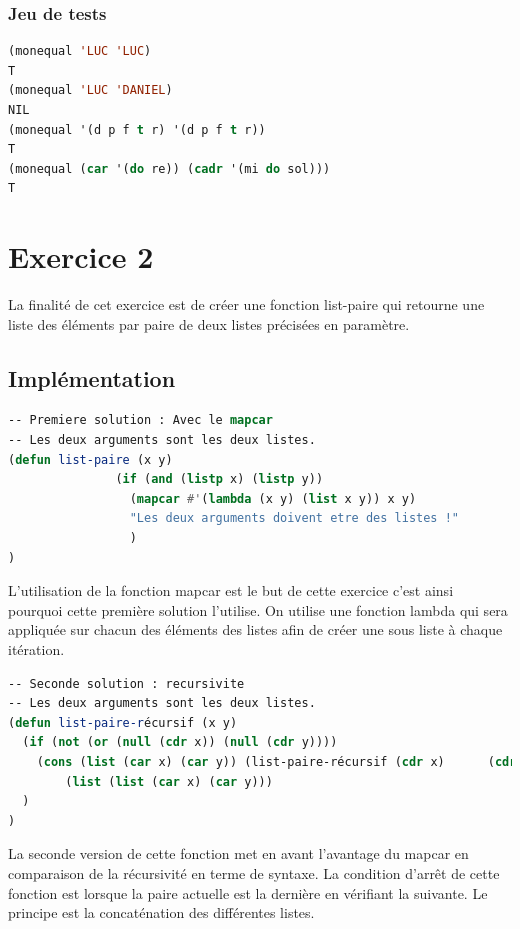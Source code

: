 \documentclass[a4paper,10pt]{report}
\begin{document}
	  \subsection{Jeu de tests}
	  \begin{lstlisting}[language=Lisp]
(monequal 'LUC 'LUC)
T
(monequal 'LUC 'DANIEL)
NIL
(monequal '(d p f t r) '(d p f t r))
T
(monequal (car '(do re)) (cadr '(mi do sol)))
T

		 \end{lstlisting}
	  \chapter{Exercice 2}
	  
	  
	    La finalité de cet exercice est de créer une fonction list-paire qui retourne une liste des éléments par paire de deux listes précisées en paramètre.
	  \section{Implémentation}
	  \begin{lstlisting}[language=Lisp]
-- Premiere solution : Avec le mapcar
-- Les deux arguments sont les deux listes.
(defun list-paire (x y)
               (if (and (listp x) (listp y))
                 (mapcar #'(lambda (x y) (list x y)) x y)
                 "Les deux arguments doivent etre des listes !"
                 )
)
	  \end{lstlisting}

	  L’utilisation de la fonction mapcar est le but de cette exercice c’est ainsi pourquoi cette première solution l’utilise. On utilise une fonction lambda qui sera appliquée sur chacun des éléments des listes afin de créer une sous liste à chaque itération.
	  
	    \begin{lstlisting}[language=Lisp]
-- Seconde solution : recursivite
-- Les deux arguments sont les deux listes.
(defun list-paire-récursif (x y)
  (if (not (or (null (cdr x)) (null (cdr y))))
  	(cons (list (car x) (car y)) (list-paire-récursif (cdr x)      (cdr y)))
     	(list (list (car x) (car y)))
  )
)
	  \end{lstlisting}
	  
La seconde version de cette fonction met en avant l’avantage du mapcar en comparaison de la récursivité en terme de syntaxe. La condition d’arrêt de cette fonction est lorsque la paire actuelle est la dernière en vérifiant la suivante. Le principe est la concaténation des différentes listes. \newpage
\end{document}

